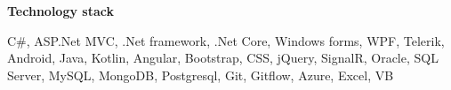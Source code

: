 \begin{cventries}
\cventry
{\textbf{Technology stack}} %
{} %
{} %
{} %
{ %
\begin{cvitems}
\item {
C\#, ASP.Net MVC, .Net framework, .Net Core, Windows forms, WPF, Telerik, Android, Java, Kotlin, Angular, Bootstrap,
 CSS, jQuery, SignalR, Oracle, SQL Server, MySQL, MongoDB, Postgresql, Git, Gitflow, Azure, Excel, VB
}
\end{cvitems}
}


\end{cventries}